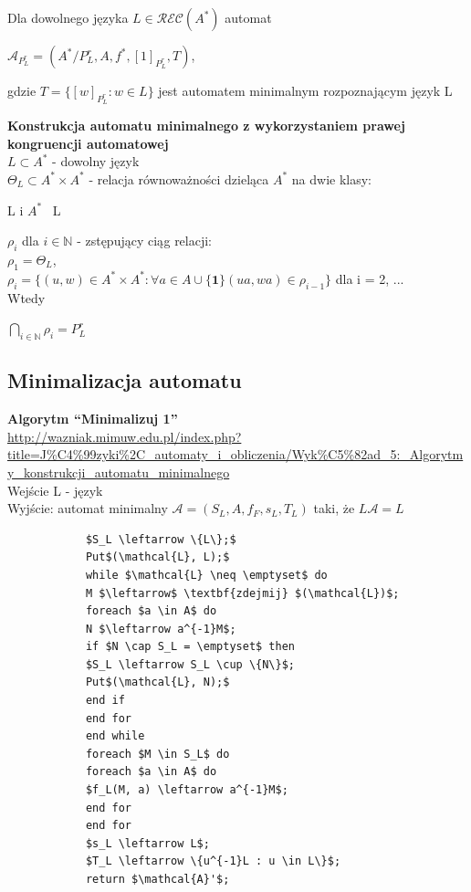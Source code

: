 \documentclass[12pt]{article}
\begin{document}
    \begin{definition}
        Dla dowolnego języka $L \in \mathcal{REC}(A^{*})$ automat
        \begin{center}
            $\mathcal{A}_{P_{L}^{r}} = (A^{*} / P_{L}^{r}, A, f^{*}, [1]_{P_{L}^{r}}, T)$,
        \end{center}
        gdzie $T = \{[w]_{P_{L}^{r}} : w \in L \}$ jest automatem minimalnym rozpoznającym język L
    \end{definition}
    \begin{definition}
        \textbf{Konstrukcja automatu minimalnego z wykorzystaniem prawej kongruencji automatowej} \\
        $L \subset A^{*}$ - dowolny język \\
        $\Theta_{L} \subset A^* \times A^*$ - relacja równoważności dzieląca $A^*$ na dwie klasy:
        \begin{center}
            L i $A^*$ \ L
        \end{center}
        $\rho_i$ dla $i \in \mathbb{N}$ - zstępujący ciąg relacji: \\
        $\rho_1 = \Theta_L$, \\
        $\rho_i = \{(u, w) \in A^* \times A^* : \forall a \in A \cup \{\textbf{1}\} (ua, wa) \in \rho_{i-1} \}$ dla i = 2, ... \\
        Wtedy
        \begin{center}
            $\bigcap\limits_{i \in \mathbb{N}} \rho_i = P^r_L$
        \end{center}
    \end{definition}


    \subsection{Minimalizacja automatu}
    \begin{definition}
        \textbf{Algorytm ``Minimalizuj 1''} \\
        \url{http://wazniak.mimuw.edu.pl/index.php?title=J\%C4\%99zyki\%2C_automaty_i_obliczenia/Wyk\%C5\%82ad_5:_Algorytmy_konstrukcji_automatu_minimalnego} \\
        Wejście L - język \\
        Wyjście: automat minimalny $\mathcal{A} = (S_L, A, f_F, s_L, T_L)$ taki, że $L\mathcal{A} = L$
        \begin{lstlisting}
            $S_L \leftarrow \{L\};$
            Put$(\mathcal{L}, L);$
            while $\mathcal{L} \neq \emptyset$ do
            M $\leftarrow$ \textbf{zdejmij} $(\mathcal{L})$;
            foreach $a \in A$ do
            N $\leftarrow a^{-1}M$;
            if $N \cap S_L = \emptyset$ then
            $S_L \leftarrow S_L \cup \{N\}$;
            Put$(\mathcal{L}, N);$
            end if
            end for
            end while
            foreach $M \in S_L$ do
            foreach $a \in A$ do
            $f_L(M, a) \leftarrow a^{-1}M$;
            end for
            end for
            $s_L \leftarrow L$;
            $T_L \leftarrow \{u^{-1}L : u \in L\}$;
            return $\mathcal{A}'$;
        \end{lstlisting}
    \end{definition}
\end{document}

